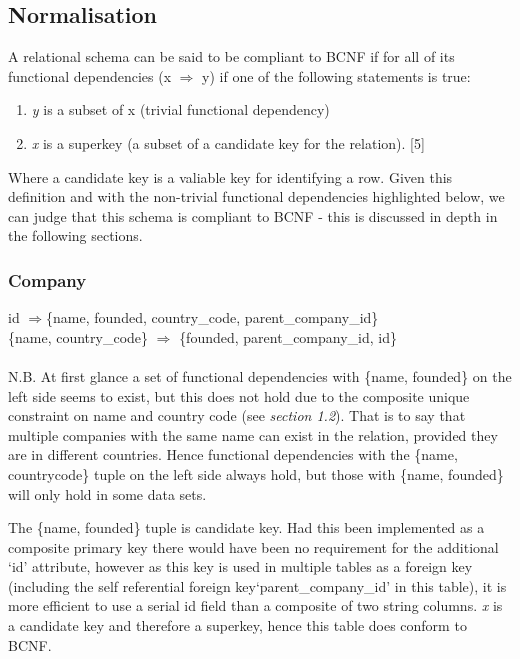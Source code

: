 \documentclass[12pt]{article}
\begin{document}
\subsection{Normalisation}
A relational schema can be said to be compliant to BCNF if for all of its functional dependencies (x $\Rightarrow$ y) if one of the following statements is true:
 \begin{enumerate}
 \item \emph{y} is a subset of x (trivial functional dependency)
\item \emph{x} is a superkey (a subset of a candidate key for the relation). [5]
\end{enumerate}
Where a candidate key is a valiable key for identifying a row. Given this definition and with the non-trivial functional dependencies highlighted below, we can judge that this schema is compliant to BCNF - this is discussed in depth in the following sections.

\subsubsection{Company}

id $\Rightarrow${\{name, founded, country\_code, parent\_company\_id\}} \\
\{{name, country\_code\}} $\Rightarrow$ {\{founded, parent\_company\_id, id\}} \\

\\ N.B. At first glance a set of functional dependencies with \{{name,  founded}\} on the left side seems to exist, but this does not hold due to the composite unique constraint on name and country code (see \emph{section 1.2}).  That is to say that multiple companies with the same name can exist in the relation, provided they are in different countries. Hence functional dependencies with the \{{name, countrycode\}} tuple on the left side always hold, but those with \{{name, founded\}} will only hold in some data sets.

The \{{name, founded\}} tuple is candidate key. Had this been implemented as a composite primary key there would have been no requirement for the additional `id' attribute, however as this key is used in multiple tables as a foreign key (including the self referential foreign key`parent\_company\_id' in this table), it is more efficient to use a serial id field than a composite of two string columns. \emph{x} is a candidate key and therefore a superkey, hence this table does conform to BCNF.
\end{document}
